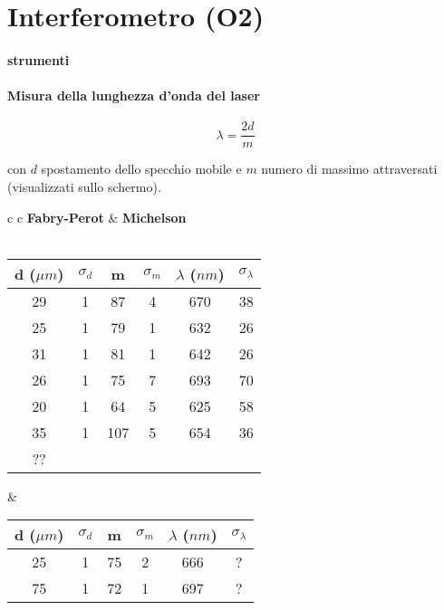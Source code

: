 
\chapter{Interferometro (O2)}

\subsubsection{ strumenti}


\subsubsection{Misura della lunghezza d'onda del laser}

$$ \lambda = \frac{2d}{m} $$

con $d$ spostamento dello specchio mobile e $m$ numero di massimo attraversati (visualizzati sullo schermo).

\begin{center}

\begin{tabular}{c c}
\textbf{Fabry-Perot} & \hspace{2cm} \textbf{Michelson}\\
\\
\begin{tabular}{c|c|c|c|c|c}
d ($\mu m$)& $\sigma_d$ & m & $\sigma_m$ & $\lambda$ ($nm$) & $\sigma_{\lambda}$\\
\midrule
29 & 1 & 87 & 4 & 670 & 38\\
25 & 1 & 79 & 1 & 632 & 26\\
31 & 1 & 81 & 1 & 642 & 26\\
26 & 1 & 75 & 7 & 693 & 70\\
20 & 1 & 64 & 5 & 625 & 58\\
35 & 1 & 107 & 5 & 654 & 36\\


?? \\

\end{tabular}

& \hspace{2cm}

\begin{tabular}{c|c|c|c|c|c}
d ($\mu m$) & $\sigma_d$ & m & $\sigma_m$ & $\lambda$ ($nm$) & $\sigma_{\lambda}$\\
\midrule
25 & 1& 75 & 2 & 666 & ?\\
75 & 1& 72 & 1 & 697 & ?\\

\end{tabular}

\end{tabular}

\end{center} 

